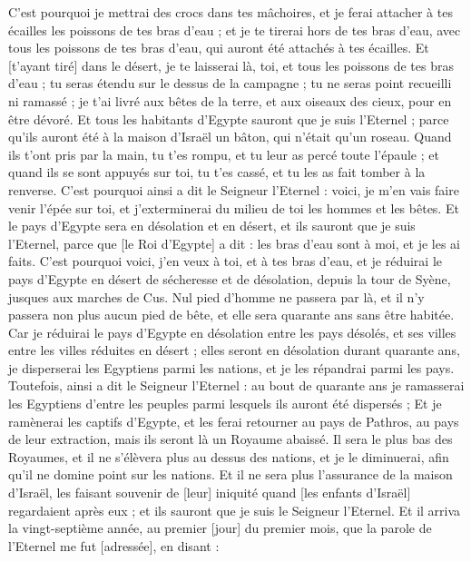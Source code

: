\begin{multicols}{2}
C'est pourquoi je mettrai des crocs dans tes mâchoires, et je ferai attacher à tes écailles les poissons de tes bras d'eau ; et je te tirerai hors de tes bras d'eau, avec tous les poissons de tes bras d'eau, qui auront été attachés à tes écailles.
Et [t'ayant tiré] dans le désert, je te laisserai là, toi, et tous les poissons de tes bras d'eau ; tu seras étendu sur le dessus de la campagne ; tu ne seras point recueilli ni ramassé ; je t'ai livré aux bêtes de la terre, et aux oiseaux des cieux, pour en être dévoré.
Et tous les habitants d'Egypte sauront que je suis l'Eternel ; parce qu'ils auront été à la maison d'Israël un bâton, qui n'était qu'un roseau.
Quand ils t'ont pris par la main, tu t'es rompu, et tu leur as percé toute l'épaule ; et quand ils se sont appuyés sur toi, tu t'es cassé, et tu les as fait tomber à la renverse.
C'est pourquoi ainsi a dit le Seigneur l'Eternel : voici, je m'en vais faire venir l'épée sur toi, et j'exterminerai du milieu de toi les hommes et les bêtes.
Et le pays d'Egypte sera en désolation et en désert, et ils sauront que je suis l'Eternel, parce que [le Roi d'Egypte] a dit : les bras d'eau sont à moi, et je les ai faits.
C'est pourquoi voici, j'en veux à toi, et à tes bras d'eau, et je réduirai le pays d'Egypte en désert de sécheresse et de désolation, depuis la tour de Syène, jusques aux marches de Cus.
Nul pied d'homme ne passera par là, et il n'y passera non plus aucun pied de bête, et elle sera quarante ans sans être habitée.
Car je réduirai le pays d'Egypte en désolation entre les pays désolés, et ses villes entre les villes réduites en désert ; elles seront en désolation durant quarante ans, je disperserai les Egyptiens parmi les nations, et je les répandrai parmi les pays.
Toutefois, ainsi a dit le Seigneur l'Eternel : au bout de quarante ans je ramasserai les Egyptiens d'entre les peuples parmi lesquels ils auront été dispersés ;
Et je ramènerai les captifs d'Egypte, et les ferai retourner au pays de Pathros, au pays de leur extraction, mais ils seront là un Royaume abaissé.
Il sera le plus bas des Royaumes, et il ne s'élèvera plus au dessus des nations, et je le diminuerai, afin qu'il ne domine point sur les nations.
Et il ne sera plus l'assurance de la maison d'Israël, les faisant souvenir de [leur] iniquité quand [les enfants d'Israël] regardaient après eux ; et ils sauront que je suis le Seigneur l'Eternel.
Et il arriva la vingt-septième année, au premier [jour] du premier mois, que la parole de l'Eternel me fut [adressée], en disant :

\end{multicols}
